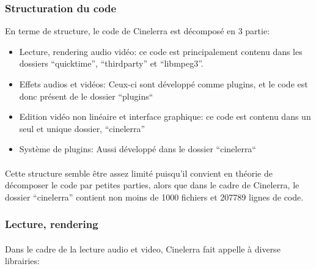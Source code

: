 \subsubsection {Structuration du code}

En terme de structure, le code de Cinelerra est décomposé en 3 partie:

\begin{itemize}

  \item{Lecture, rendering  audio vidéo: ce code est principalement
    contenu dans les dossiers ``quicktime'', ``thirdparty'' et
    ``libmpeg3''.}

  \item{Effets audios et vidéos: Ceux-ci sont développé comme plugins,
    et le code est donc présent de le dossier ``plugins`` }

  \item{Edition vidéo non linéaire et interface graphique: ce code est
    contenu dans un seul et unique dossier, ``cinelerra''}

  \item{Système de plugins: Aussi développé dans le dossier
  ``cinelerra``}

\end{itemize}

\paragraph{}

Cette structure semble être assez limité puisqu'il convient en théorie
de décomposer le code par petites parties, alors que dans le cadre de
Cinelerra, le dossier ``cinelerra'' contient non  moins de 1000 fichiers
et 207789 lignes de code.

\subsubsection{Lecture, rendering}

\paragraph{}

Dans le cadre de la lecture audio et video, Cinelerra fait appelle à
diverse librairies:

